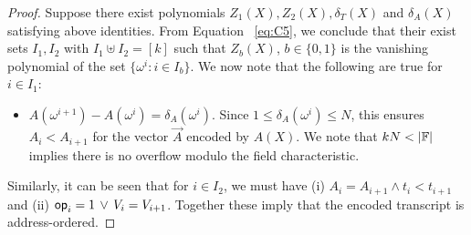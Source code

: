 \begin{proof}
    Suppose there exist polynomials $Z_1(X),Z_2(X),\delta_T(X)$ and $\delta_A(X)$ satisfying above identities. From Equation
    ~\eqref{eq:C5}, we conclude that their exist sets $I_1,I_2$ with $I_1\uplus I_2=[k]$ such that $Z_b(X)$, $b\in \{0,1\}$ is the
    vanishing polynomial of the set $\{\omega^i: i\in I_b\}$. We now note that the following are true for $i\in I_1$:
    \begin{itemize}[leftmargin=1em]
        \item $A(\omega^{i+1})-A(\omega^i)=\delta_A(\omega^i)$. Since $1\leq \delta_A(\omega^i)\leq N$, this ensures $A_i < A_{i+1}$ for the vector $\vec{A}$ encoded
        by $A(X)$. We note that $kN < |\mathbb{F}|$ implies there is no overflow modulo the field characteristic.
    \end{itemize}
    Similarly, it can be seen that for $i\in I_2$, we must have (i) $A_i=A_{i+1}\wedge t_i < t_{i+1}$
    and (ii) $\mathsf{op}_i=1\,\vee\,V_i=V_{i+1}$. Together these imply that the encoded transcript is address-ordered.
\end{proof}

